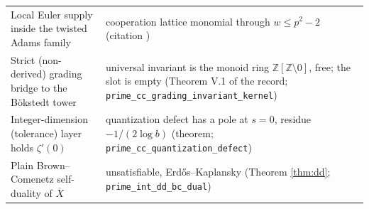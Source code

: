 \documentclass[11pt,reqno]{amsart}
\theoremstyle{plain}
\theoremstyle{definition}
\theoremstyle{remark}
\newcommand{\Z}{\mathbb{Z}}
\newcommand{\Xbar}{\overline{X}}
\begin{document}
\begin{center}
\begin{tabular}{>{\raggedright\arraybackslash}p{} >{\raggedright\arraybackslash}p{}}
Local Euler supply inside the twisted Adams family &
cooperation lattice monomial through $w \le p^2 - 2$ (citation \cite{Kane81,BakerRichter05}) \\[2pt]
Strict (non-derived) grading bridge to the B\"okstedt tower &
universal invariant is the monoid ring $\Z[\Z\setminus 0]$, free; the slot is empty
(Theorem V.1 of the record; \texttt{prime\_\allowbreak cc\_\allowbreak grading\_\allowbreak invariant\_\allowbreak kernel}) \\[2pt]
Integer-dimension (tolerance) layer holds $\zeta'(0)$ &
quantization defect has a pole at $s = 0$, residue $-1/(2\log b)$ (theorem;
\texttt{prime\_\allowbreak cc\_\allowbreak quantization\_\allowbreak defect}) \\[2pt]
Plain Brown--Comenetz self-duality of $\Xbar$ &
unsatisfiable, Erd\H{o}s--Kaplansky (Theorem \ref{thm:dd};
\texttt{prime\_\allowbreak int\_\allowbreak dd\_\allowbreak bc\_\allowbreak dual}) \\[2pt]
\bottomrule
\end{tabular}
\end{center}
\end{document}
